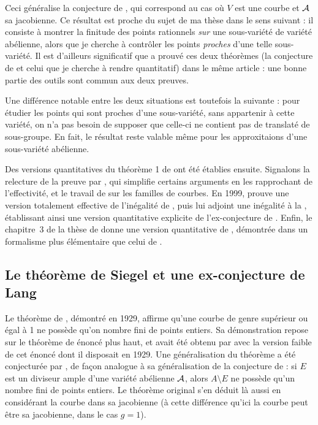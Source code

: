 \documentclass{mpg-preth}
\begin{document}
Ceci généralise la conjecture de , qui correspond au cas où $V$
est une courbe et $\mathcal A$ sa jacobienne. Ce résultat est proche du sujet de ma
thèse dans le sens suivant : il consiste à montrer la finitude des points
rationnels \emph{sur} une sous-variété de variété abélienne, alors que je
cherche à contrôler les points \emph{proches} d'une telle sous-variété. Il est
d'ailleurs significatif que  a prouvé ces deux théorèmes (la
conjecture de  et celui que je cherche à rendre quantitatif)
dans le même article : une bonne partie des outils sont commun aux deux
preuves.

Une différence notable entre les deux situations est toutefois la suivante :
pour étudier les points qui sont proches d'une sous-variété, sans appartenir
à cette variété, on n'a pas besoin de supposer que celle-ci ne contient pas de
translaté de sous-groupe. En fait, le résultat reste valable même pour les
approxitaions d'une sous-variété abélienne.

Des versions quantitatives du théorème 1 de \cite{faldaav} ont été établies
ensuite. Signalons la relecture de la preuve par , qui simplifie
certains arguments en les rapprochant de l'effectivité, et le travail de
 sur les familles de courbes. En 1999,  prouve une
version totalement effective de l'inégalité de , puis lui adjoint
une inégalité à la , établissant ainsi une version quantitative
explicite de l'ex-conjecture de . Enfin, le chapitre~3 de la
thèse de  \cite{farhith} donne une version quantitative de
, démontrée dans un formalisme plus élémentaire que celui de
.

\subsection{Le théorème de Siegel et une ex-conjecture de Lang}
\label{s-siegel}

Le théorème de , démontré en 1929, affirme qu'une courbe de genre
supérieur ou égal à 1 ne possède qu'on nombre fini de points entiers. Sa
démonstration repose sur le théorème de  énoncé plus haut, et avait
été obtenu par  avec la version faible de cet énoncé dont il
disposait en 1929.  Une généralisation du théorème a été conjecturée par
, de façon analogue à sa généralisation de la conjecture de
 : si $E$ est un diviseur ample d'une variété abélienne $\mathcal A$,
alors $A \setminus E$ ne possède qu'un nombre fini de points entiers. Le
théorème original s'en déduit là aussi en considérant la courbe dans sa
jacobienne (à cette différence qu'ici la courbe peut être sa jacobienne, dans
le cas $g=1$).
\end{document}
